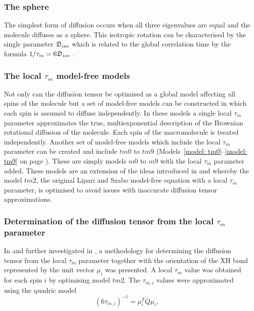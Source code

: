 \subsubsection{The sphere}

The simplest form of diffusion occurs when all three eigenvalues are equal and the molecule diffuses as a sphere.
This isotropic rotation can be characterised by the single parameter $\mathfrak{D}_{iso}$ which is related to the global correlation time by the formula $1/\tau_m = 6\mathfrak{D}_{iso}$ \citep{Bloembergen48}.


\subsubsection{The local $\tau_m$ model-free models}

Not only can the diffusion tensor be optimised as a global model affecting all spins of the molecule but a set of model-free models can be constructed in which each spin is assumed to diffuse independently.
In these models a single local $\tau_m$ parameter approximates the true, multiexponential description of the Brownian rotational diffusion of the molecule.
Each spin of the macromolecule is treated independently.
Another set of model-free models which include the local $\tau_m$ parameter can be created and include $tm0$ to $tm9$ (Models~\ref{model: tm0}--\ref{model: tm9} on page \pageref{model: tm0}).
These are simply models $m0$ to $m9$ with the local $\tau_m$ parameter added.
These models are an extension of the ideas introduced in \citet{Barbato92} and \citet{Schurr94} whereby the model $tm2$, the original Lipari and Szabo model-free equation with a local $\tau_m$ parameter, is optimised to avoid issues with inaccurate diffusion tensor approximations.


\subsubsection{Determination of the diffusion tensor from the local $\tau_m$ parameter}

In \citet{Bruschweiler95} and further investigated in \citet{Lee97}, a methodology for determining the diffusion tensor from the local $\tau_m$ parameter together with the orientation of the XH bond represented by the unit vector $\mu_i$ was presented.
A local $\tau_m$ value was obtained for each spin $i$ by optimising model $tm2$.
The $\tau_{m,i}$ values were approximated using the quadric model
\begin{equation} \label{eq: quadric}
 (6 \tau_{m,i})^{-1} = \mu_i^T Q \mu_i,
\end{equation}

